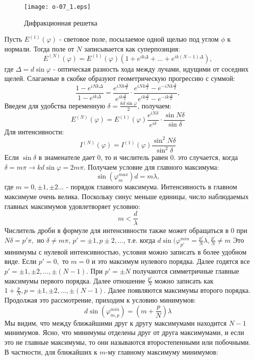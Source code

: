 \documentclass[__main__.tex]{subfiles}
\begin{document}
\begin{figure}[h]
	\begin{center}
		\texttt{[image: o-07\_1.eps]}
		\caption{Дифракционная решетка}
	\end{center}
\end{figure}

Пусть $E^{(1)} (\varphi)$ - световое поле, посылаемое одной щелью под углом $\phi$ к нормали. Тогда поле от $N$ записывается как суперпозиция:
$$E^{(N)}(\varphi) = E^{(1)}(\varphi)(1 + e^{ik\Delta} + ... + e^{ik(N-1)\Delta}),$$
где $\Delta = d\sin \varphi$ - оптическая разность хода между лучами, идущими от соседних щелей. Слагаемые в скобке образуют геометрическую прогрессию с суммой:
$$\frac{1-e^{iNk\Delta}}{1-e^{ik\Delta}} = \frac{e^{iNk\frac{\Delta}{2}}}{e^{ik\frac{\Delta}{2}}}\cdot \frac{e^{iNk\frac{\Delta}{2}} - e^{-iNk\frac{\Delta}{2}}}{e^{ik\frac{\Delta}{2}} - e^{-ik\frac{\Delta}{2}}},$$
Введем для удобства переменную $\delta = \frac{kd\sin\varphi}{2}$, получаем:
$$E^{(N)}(\varphi) = E^{(1)}(\varphi)\frac{e^{iN\delta}}{e^{i\delta}}\cdot \frac{\sin N\delta}{\sin\delta}$$
Для интенсивности:
$$I^{(N)}(\varphi) = I^{(1)}(\varphi)\frac{\sin^2 N\delta}{\sin^2\delta}$$
Если $\sin \delta$ в знаменателе дает 0, то и числитель равен 0. это случается, когда $\delta = m\pi \rightarrow kd\sin\varphi = 2m\pi$. Получаем условие для главного максимума:
$$\sin(\varphi^{max}_m)d = m\lambda,$$
где $m = 0, \pm 1, \pm 2...$ - порядок главного максимума. Интенсивность в главном максимуме очень велика. Поскольку синус меньше единицы, число наблюдаемых главных максимумов удовлетворяет условию:
$$m < \frac{d}{\lambda}$$
Числитель дроби в формуле для интенсивности также может обращаться в 0 при $N\delta = p'\pi, $ но $\delta \neq m\pi$, $p' = \pm 1, p\pm 2, ...$, т.е. когда $d\sin(\varphi ^{min}_{p'} = \frac{p'}{N}\lambda, \frac{p'}{N} \neq m$  
Это минимумы с нулевой интенсивностью, условия можно записать в более удобном виде. Если $p' = 0, $ то $m = 0$ и это максимум нулевого порядка. Далее годятся все $p' = \pm1, \pm2, ... , \pm(N-1). $ При $p' = \pm N$ получаются симметричные главные максимумы первого порядка. Далее отношение $\frac{p'}{N}$ можно записать как $1 + \frac{p}{N}, p =  \pm1, \pm2, ... , \pm(N-1)$. Далее появляются максимумы второго порядка. Продолжая это рассмотрение, приходим к условию минимумов:
$$d \sin(\varphi^{min}_{m, p}) = (m + \frac{p}{N})\lambda$$
Мы видим, что между ближайшими друг к другу максимумами находится $N - 1$ минимумов. Ясно, что минимумы отделены друг от друга максимумами, и если это не главные максимумы, то они называются второстепенными или побочными. В частности, для ближайших к $m$-му главному максимуму минимумов:
\end{document}
